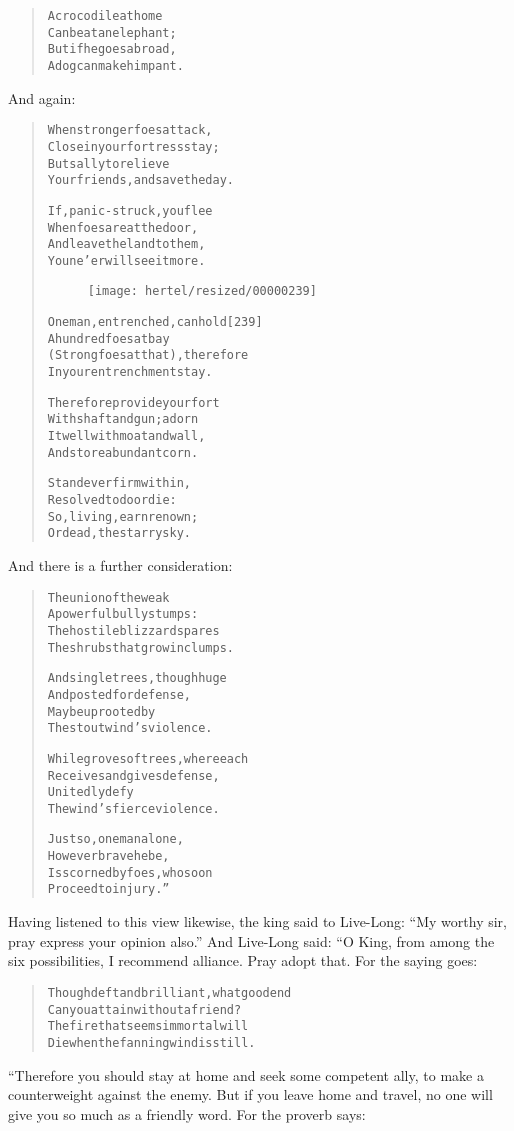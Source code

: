 \documentclass[article, twoside, 10pt]{memoir}
\renewenvironment{verbatim}{%
\begin{quote}%
\vskip -10pt%
\begin{alltt}\normalfont\small}{\end{alltt}%
\end{quote}%
\vskip -10pt
} %
\begin{document}
\begin{verbatim}
A crocodile at home
    Can beat an elephant;
But if he goes abroad,
    A dog can make him pant.
\end{verbatim}
And again:

\begin{verbatim}
When stronger foes attack,
    Close in your fortress stay;
But sally to relieve
    Your friends, and save the day.

If, panic-struck, you flee
    When foes are at the door,
And leave the land to them,
    You ne'er will see it more.

\begin{figure}[p]\texttt{[image: hertel/resized/00000239]}\end{figure}One man, entrenched, can hold                           [239]
    A hundred foes at bay
(Strong foes at that), therefore
    In your entrenchment stay.

Therefore provide your fort
    With shaft and gun; adorn
It well with moat and wall,
    And store abundant corn.

Stand ever firm within,
    Resolved to do or die:
So, living, earn renown;
    Or dead, the starry sky.
\end{verbatim}
And there is a further consideration:

\begin{verbatim}
The union of the weak
    A powerful bully stumps:
The hostile blizzard spares
    The shrubs that grow in clumps.

And single trees, though huge
    And posted for defense,
May be uprooted by
    The stout wind's violence.

While groves of trees, where each
    Receives and gives defense,
Unitedly defy
    The wind's fierce violence.

Just so, one man alone,
    However brave he be,
Is scorned by foes, who soon
    Proceed to injury.”
\end{verbatim}
Having listened to this view likewise, the king said to Live-Long:
``My worthy sir, pray express your opinion also.'' And Live-Long
said: “O King, from among the six possibilities, I recommend
alliance. Pray adopt that. For the saying goes:

\begin{verbatim}
Though deft and brilliant, what good end
Can you attain without a friend?
The fire that seems immortal will
Die when the fanning wind is still.
\end{verbatim}
“Therefore you should stay at home and seek some competent ally, to
make a counterweight against the enemy. But if you leave home and
travel, no one will give you so much as a friendly word. For the
proverb says:
\end{document}
